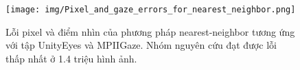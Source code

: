 \begin{center}
    \begin{figure}[h!]
    \begin{center}
     \texttt{[image: img/Pixel\_and\_gaze\_errors\_for\_nearest\_neighbor.png]}
    \end{center}
    \caption{Lỗi pixel và điểm nhìn của phương pháp nearest-neighbor tương ứng với tập UnityEyes và MPIIGaze. Nhóm nguyên cứu đạt được lỗi thấp nhất ở 1.4 triệu hình ảnh.}
    \label{refhinh15}
    \end{figure}
\end{center}


\newpage



